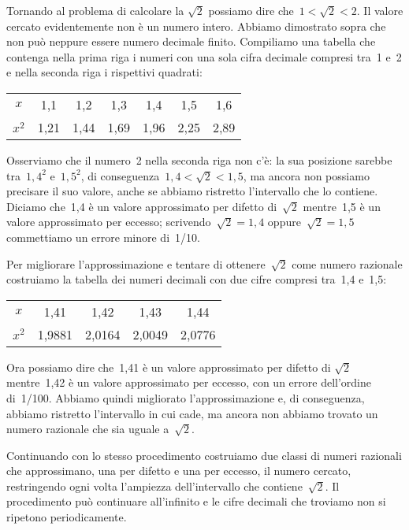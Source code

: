 Tornando al problema di calcolare la \(\sqrt{2}\) possiamo dire 
che~\(1<\sqrt{2}<2\). 
Il valore cercato evidentemente non è un numero intero. 
Abbiamo dimostrato sopra che non può neppure essere
numero decimale finito.
Compiliamo una tabella che contenga nella prima
riga i numeri con una sola cifra decimale compresi tra~1 e~2 e nella
seconda riga i rispettivi quadrati:

\begin{center}
\begin{tabular}{ccccccc}
\toprule
\(x\) & 1,1 & 1,2 & 1,3 & 1,4 & 1,5 & 1,6\\
\(x^{2}\) & 1,21 & 1,44 & 1,69 & 1,96 & 2,25 & 2,89\\
\bottomrule
\end{tabular}
\end{center}

Osserviamo che il numero~2 nella seconda riga non c'è: la sua posizione 
sarebbe tra~\(1,4^{2}\) e~\(1,5^{2}\),
di conseguenza~\(1,4<\sqrt{2}<1,5\), ma ancora
non possiamo precisare il suo valore, anche se abbiamo ristretto
l'intervallo che lo contiene. Diciamo che~1,4 è un valore 
approssimato per difetto di~\(\sqrt{2}\) mentre~1,5
è un valore approssimato per eccesso; scrivendo~\(\sqrt{2}=1,4\)
oppure~\(\sqrt{2}=1,5\) commettiamo un errore minore di~1/10.

Per migliorare l'approssimazione e tentare di ottenere~\(\sqrt{2}\)
come numero razionale costruiamo la tabella dei numeri
decimali con due cifre compresi tra~1,4 e~1,5:

\begin{center}
\begin{tabular}{ccccc}
\toprule
\(x\) &1,41 &1,42 &1,43 &1,44\\
\(x^{2}\) & 1,9881 & 2,0164 & 2,0049 & 2,0776\\
\bottomrule
\end{tabular}
\end{center}

Ora possiamo dire che~1,41 è un valore approssimato per difetto 
di \(\sqrt{2}\) mentre~1,42 è un valore approssimato per eccesso, con 
un errore dell'ordine di~1/100. 
Abbiamo quindi migliorato l'approssimazione e, di conseguenza, abbiamo 
ristretto l'intervallo in cui cade, ma ancora non abbiamo trovato un 
numero razionale che sia uguale a~\(\sqrt{2}\).

Continuando con lo stesso procedimento costruiamo due classi di numeri 
razionali che approssimano, una per difetto e una per eccesso, 
il numero cercato, restringendo ogni volta l'ampiezza 
dell'intervallo che contiene~\(\sqrt{2}\).
Il procedimento può continuare all'infinito e le cifre decimali che 
troviamo non si ripetono periodicamente.

